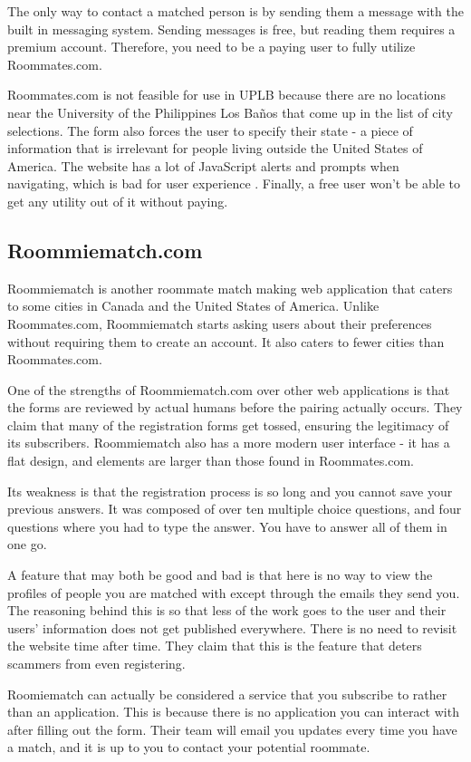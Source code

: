 \documentclass[journal]{./IEEE/IEEEtran}
\newcommand{\UPLB}{University of the Philippines Los Ba\~{n}os }
\begin{document}
The only way to contact a matched person is by sending them a message with the built in messaging system. Sending messages is free, but reading them requires a premium account. Therefore, you need to be a paying user to fully utilize Roommates.com.

Roommates.com is not feasible for use in UPLB because there are no locations near the \UPLB that come up in the list of city selections. The form also forces the user to specify their state - a piece of information that is irrelevant for people living outside the United States of America. The website has a lot of JavaScript alerts and prompts when navigating, which is bad for user experience \cite{UX1}. Finally, a free user won't be able to get any utility out of it without paying.

\subsection{Roommiematch.com}
Roommiematch is another roommate match making web application that caters to some cities in Canada and the United States of America. Unlike Roommates.com, Roommiematch starts asking users about their preferences without requiring them to create an account. It also caters to fewer cities than Roommates.com.

One of the strengths of Roommiematch.com over other web applications is that the forms are reviewed by actual humans before the pairing actually occurs. They claim that many of the registration forms get tossed, ensuring the legitimacy of its subscribers. Roommiematch also has a more modern user interface - it has a flat design, and elements are larger than those found in Roommates.com.

Its weakness is that the registration process is so long and you cannot save your previous answers. It was composed of over ten multiple choice questions, and four questions where you had to type the answer. You have to answer all of them in one go.

A feature that may both be good and bad is that here is no way to view the profiles of people you are matched with except through the emails they send you. The reasoning behind this is so that less of the work goes to the user and their users' information does not get published everywhere. There is no need to revisit the website time after time. They claim that this is the feature that deters scammers from even registering.

Roomiematch can actually be considered a service that you subscribe to rather than an application. This is because there is no application you can interact with after filling out the form. Their team will email you updates every time you have a match, and it is up to you to contact your potential roommate.
\end{document}
